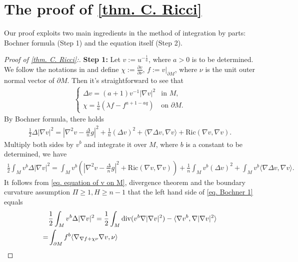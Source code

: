 \documentclass[12pt]{amsart}%
\numberwithin{equation}{section}
\numberwithin{lemma}{section}
\numberwithin{proposition}{section}
\numberwithin{corollary}{section}
\numberwithin{remark}{section}
\begin{document}
\section{The proof of \cref{thm. C. Ricci}}\label{sec2}
Our proof exploits two main ingredients in the method of integration by parts: Bochner formula (Step 1) and the equation itself (Step 2).
\begin{proof}[Proof of \cref{thm. C. Ricci}:]
\textbf{Step 1:}
    Let $v:=u^{-\frac{1}{a}}$, where $a>0$ is to be determined. We follow the notations in \cite{GHW21} and define $\chi:=\frac{\partial v}{\partial \nu},\, f:=v|_{\partial M}$, where $\nu$ is the unit outer normal vector of $\partial M$. Then it's straightforward to see that
    \begin{align}\label{eq. equation of v on M}
        \begin{cases}
            \Delta v=(a+1)v^{-1}|\nabla v|^2 &\text{in }M,\\
            \chi=\frac{1}{a}(\lambda f-f^{a+1-aq}) &\text{on }\partial M.
        \end{cases}
    \end{align}
    By Bochner formula, there holds
    \begin{align*}
        \frac{1}{2}\Delta |\nabla v|^2
        =\left|\nabla^2 v-\frac{\Delta}{n}g\right|^2
        +\frac{1}{n}(\Delta v)^2
        +\langle \nabla \Delta v,\nabla v\rangle
        +\mathrm{Ric}(\nabla v,\nabla v).
    \end{align*}
    Multiply both sides by $v^b$ and integrate it over $M$, where $b$ is a constant to be determined, we have
    \begin{align}\label{eq. Bochner 1}
        \frac{1}{2}\int_M v^b\Delta |\nabla v|^2
        =\int_Mv^b\left(\left|\nabla^2 v-\frac{\Delta}{n}g\right|^2+\mathrm{Ric}(\nabla v,\nabla v) \right)
        +\frac{1}{n}\int_M v^b(\Delta v)^2
        +\int_M v^b\langle \nabla \Delta v,\nabla v\rangle
        .
    \end{align}
    It follows from \cref{eq. equation of v on M}, divergence theorem and the boundary curvature assumption $\Pi\geq 1, H\geq n-1$ that the left hand side of \cref{eq. Bochner 1} equals
    \begin{align}\label{eq. LHS of 1}
        &\frac{1}{2}\int_M v^b\Delta |\nabla v|^2
        =\frac{1}{2}\int_M \mathrm{div}(v^b\nabla|\nabla v|^2)
        -\langle\nabla v^b,\nabla |\nabla v|^2\rangle\notag\\
        =&\int_{\partial M}f^b\langle\nabla_{\nabla f+\chi\nu}\nabla v,\nu\rangle

\end{align}
\end{proof}
\end{document}

